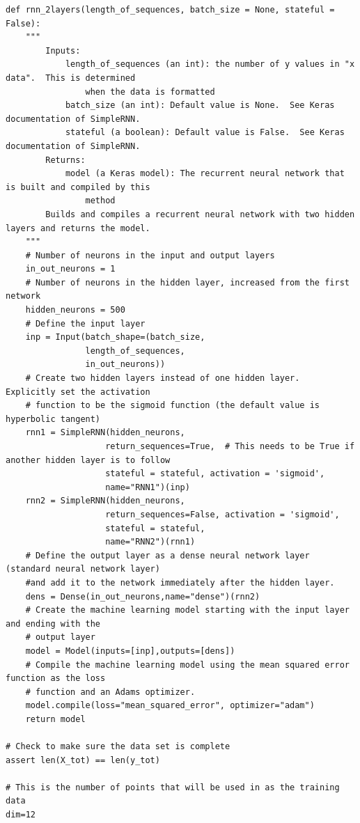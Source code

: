 \documentclass[%
oneside,                 %
final,                   %
10pt]{article}
\begin{document}
\begin{verbatim}
def rnn_2layers(length_of_sequences, batch_size = None, stateful = False):
    """
        Inputs:
            length_of_sequences (an int): the number of y values in "x data".  This is determined
                when the data is formatted
            batch_size (an int): Default value is None.  See Keras documentation of SimpleRNN.
            stateful (a boolean): Default value is False.  See Keras documentation of SimpleRNN.
        Returns:
            model (a Keras model): The recurrent neural network that is built and compiled by this
                method
        Builds and compiles a recurrent neural network with two hidden layers and returns the model.
    """
    # Number of neurons in the input and output layers
    in_out_neurons = 1
    # Number of neurons in the hidden layer, increased from the first network
    hidden_neurons = 500
    # Define the input layer
    inp = Input(batch_shape=(batch_size, 
                length_of_sequences, 
                in_out_neurons))  
    # Create two hidden layers instead of one hidden layer.  Explicitly set the activation
    # function to be the sigmoid function (the default value is hyperbolic tangent)
    rnn1 = SimpleRNN(hidden_neurons, 
                    return_sequences=True,  # This needs to be True if another hidden layer is to follow
                    stateful = stateful, activation = 'sigmoid',
                    name="RNN1")(inp)
    rnn2 = SimpleRNN(hidden_neurons, 
                    return_sequences=False, activation = 'sigmoid',
                    stateful = stateful,
                    name="RNN2")(rnn1)
    # Define the output layer as a dense neural network layer (standard neural network layer)
    #and add it to the network immediately after the hidden layer.
    dens = Dense(in_out_neurons,name="dense")(rnn2)
    # Create the machine learning model starting with the input layer and ending with the 
    # output layer
    model = Model(inputs=[inp],outputs=[dens])
    # Compile the machine learning model using the mean squared error function as the loss 
    # function and an Adams optimizer.
    model.compile(loss="mean_squared_error", optimizer="adam")  
    return model

# Check to make sure the data set is complete
assert len(X_tot) == len(y_tot)

# This is the number of points that will be used in as the training data
dim=12


\end{verbatim}
\end{document}
